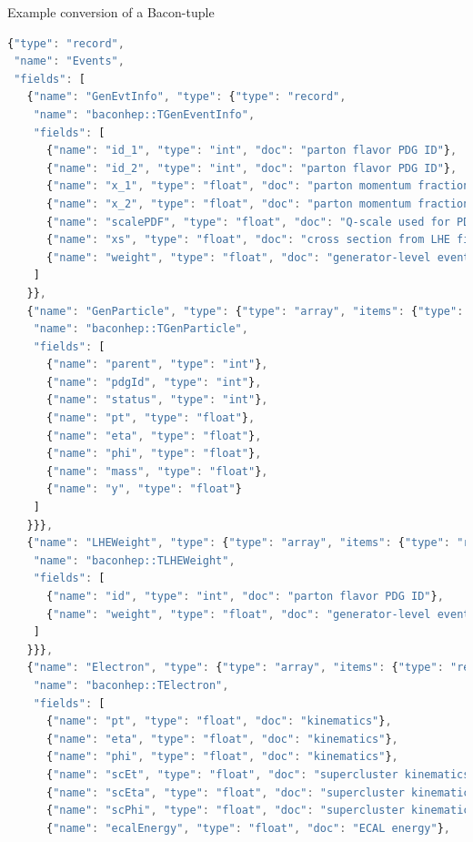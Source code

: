 \documentclass{beamer}
\begin{document}
\begin{frame}[fragile]{Example conversion of a Bacon-tuple}
\scriptsize
\begin{lstlisting}[language=js]
{"type": "record",
 "name": "Events",
 "fields": [
   {"name": "GenEvtInfo", "type": {"type": "record",
    "name": "baconhep::TGenEventInfo",
    "fields": [
      {"name": "id_1", "type": "int", "doc": "parton flavor PDG ID"},
      {"name": "id_2", "type": "int", "doc": "parton flavor PDG ID"},
      {"name": "x_1", "type": "float", "doc": "parton momentum fraction"},
      {"name": "x_2", "type": "float", "doc": "parton momentum fraction"},
      {"name": "scalePDF", "type": "float", "doc": "Q-scale used for PDF evaluation"},
      {"name": "xs", "type": "float", "doc": "cross section from LHE file"},
      {"name": "weight", "type": "float", "doc": "generator-level event weight"}
    ]
   }},
   {"name": "GenParticle", "type": {"type": "array", "items": {"type": "record",
    "name": "baconhep::TGenParticle",
    "fields": [
      {"name": "parent", "type": "int"},
      {"name": "pdgId", "type": "int"},
      {"name": "status", "type": "int"},
      {"name": "pt", "type": "float"},
      {"name": "eta", "type": "float"},
      {"name": "phi", "type": "float"},
      {"name": "mass", "type": "float"},
      {"name": "y", "type": "float"}
    ]
   }}},
   {"name": "LHEWeight", "type": {"type": "array", "items": {"type": "record",
    "name": "baconhep::TLHEWeight",
    "fields": [
      {"name": "id", "type": "int", "doc": "parton flavor PDG ID"},
      {"name": "weight", "type": "float", "doc": "generator-level event weight"}
    ]
   }}},
   {"name": "Electron", "type": {"type": "array", "items": {"type": "record",
    "name": "baconhep::TElectron",
    "fields": [
      {"name": "pt", "type": "float", "doc": "kinematics"},
      {"name": "eta", "type": "float", "doc": "kinematics"},
      {"name": "phi", "type": "float", "doc": "kinematics"},
      {"name": "scEt", "type": "float", "doc": "supercluster kinematics"},
      {"name": "scEta", "type": "float", "doc": "supercluster kinematics"},
      {"name": "scPhi", "type": "float", "doc": "supercluster kinematics"},
      {"name": "ecalEnergy", "type": "float", "doc": "ECAL energy"},
\end{lstlisting}
\end{frame}
\end{document}
